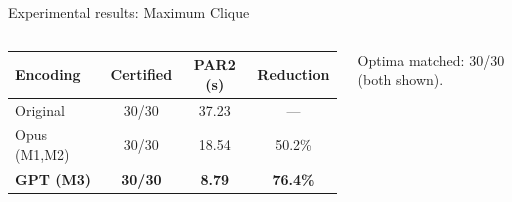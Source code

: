 \documentclass[10pt,aspectratio=169]{beamer}
\begin{document}
\begin{frame}[fragile]{Experimental results: Maximum Clique}
\begin{columns}[T,onlytextwidth]
\vspace{0.25em}
{\centering\scriptsize
\setlength{\tabcolsep}{3.1pt}
\renewcommand{\arraystretch}{1.08}
\begin{tabular}{@{}lccc@{}}
\toprule
Encoding & Certified & PAR2 (s) & Reduction \\
\midrule
Original & 30/30 & 37.23 & --- \\
Opus (M1,M2) & 30/30 & 18.54 & 50.2\% \\
\textbf{GPT (M3)} & \textbf{30/30} & \textbf{8.79} & \alert{\textbf{76.4\%}} \\
\bottomrule
\end{tabular}\par}
\vspace{0.08em}
{\scriptsize\color{midgray}
Optima matched: 30/30 (both shown).}
\end{columns}
\end{frame}
\end{document}

